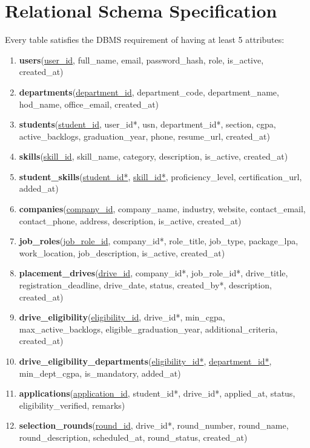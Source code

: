 \documentclass[12pt,a4paper]{report}
\begin{document}
\section{Relational Schema Specification}
Every table satisfies the DBMS requirement of having at least 5 attributes:
\begin{enumerate}
    \item \textbf{users}(\underline{user\_id}, full\_name, email, password\_hash, role, is\_active, created\_at)
    \item \textbf{departments}(\underline{department\_id}, department\_code, department\_name, hod\_name, office\_email, created\_at)
    \item \textbf{students}(\underline{student\_id}, user\_id*, usn, department\_id*, section, cgpa, active\_backlogs, graduation\_year, phone, resume\_url, created\_at)
    \item \textbf{skills}(\underline{skill\_id}, skill\_name, category, description, is\_active, created\_at)
    \item \textbf{student\_skills}(\underline{student\_id*}, \underline{skill\_id*}, proficiency\_level, certification\_url, added\_at)
    \item \textbf{companies}(\underline{company\_id}, company\_name, industry, website, contact\_email, contact\_phone, address, description, is\_active, created\_at)
    \item \textbf{job\_roles}(\underline{job\_role\_id}, company\_id*, role\_title, job\_type, package\_lpa, work\_location, job\_description, is\_active, created\_at)
    \item \textbf{placement\_drives}(\underline{drive\_id}, company\_id*, job\_role\_id*, drive\_title, registration\_deadline, drive\_date, status, created\_by*, description, created\_at)
    \item \textbf{drive\_eligibility}(\underline{eligibility\_id}, drive\_id*, min\_cgpa, max\_active\_backlogs, eligible\_graduation\_year, additional\_criteria, created\_at)
    \item \textbf{drive\_eligibility\_departments}(\underline{eligibility\_id*}, \underline{department\_id*}, min\_dept\_cgpa, is\_mandatory, added\_at)
    \item \textbf{applications}(\underline{application\_id}, student\_id*, drive\_id*, applied\_at, status, eligibility\_verified, remarks)
    \item \textbf{selection\_rounds}(\underline{round\_id}, drive\_id*, round\_number, round\_name, round\_description, scheduled\_at, round\_status, created\_at)

\end{enumerate}
\end{document}
